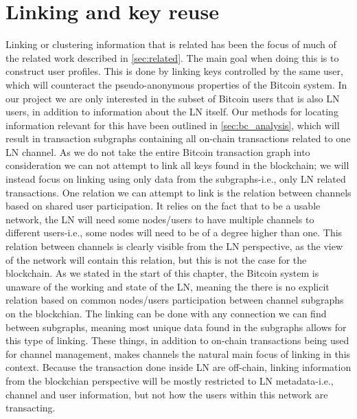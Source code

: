 

\section{Linking and key reuse}
\label{sec:linking}

Linking or clustering information that is related has been the focus of much of the related work described in \cref{sec:related}. The main goal when doing this is to construct user profiles. This is done by linking keys controlled by the same user, which will counteract the pseudo-anonymous properties of the Bitcoin system. In our project we are only interested in the subset of Bitcoin users that is also LN users, in addition to information about the LN itself. 
Our methods for locating information relevant for this have been outlined in \cref{sec:bc_analysis}, which will result in transaction subgraphs containing all on-chain transactions related to one LN channel. As we do not take the entire Bitcoin transaction graph into consideration we can not attempt to link all keys found in the blockchain; we will instead focus on linking using only data from the subgraphs-i.e., only LN related transactions. 
One relation we can attempt to link is the relation between channels based on shared user participation.
It relies on the fact that to be a usable network, the LN will need some nodes/users to have multiple channels to different users-i.e., some nodes will need to be of a degree higher than one. This relation between channels is clearly visible from the LN perspective, as the view of the network will contain this relation, but this is not the case for the blockchain. As we stated in the start of this chapter, the Bitcoin system is unaware of the working and state of the LN, meaning the there is no explicit relation based on common nodes/users participation between channel subgraphs on the blockchian. The linking can be done with any connection we can find between subgraphs, meaning most unique data found in the subgraphs allows for this type of linking. These things, in addition to on-chain transactions being used for channel management, makes channels the natural main focus of linking in this context. Because the transaction done inside LN are off-chain, linking information from the blockchian perspective will be mostly restricted to LN metadata-i.e., channel and user information, but not how the users within this network are transacting.
\\

